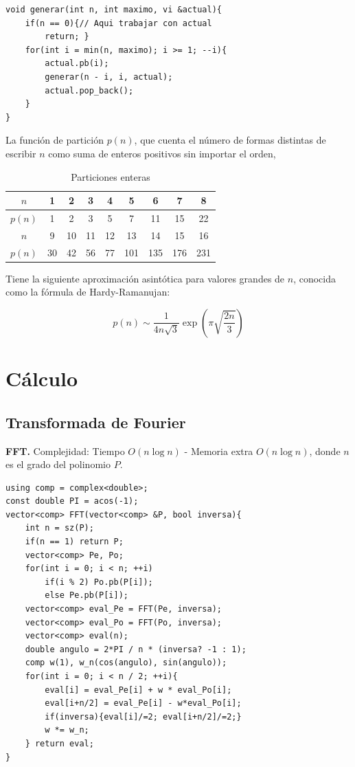 \documentclass[10pt,spanish,mexico]{article}
\numberwithin{equation}{section}
\begin{document}
\begin{multicols}{2}
\begin{verbatim}
void generar(int n, int maximo, vi &actual){
    if(n == 0){// Aqui trabajar con actual
        return; }
    for(int i = min(n, maximo); i >= 1; --i){
        actual.pb(i);
        generar(n - i, i, actual);
        actual.pop_back();
    }
}
\end{verbatim}
La función de partición \( p(n) \), que cuenta el número de formas distintas de escribir \( n \) como suma de enteros positivos sin importar el orden,

\begin{table}[H]
	\centering
	\begin{tabular}{|c|cccccccc|}
		\hline
		$n$ & 1 & 2 & 3 & 4 & 5 & 6 & 7 & 8\\
		\hline
		$p(n)$ & 1 & 2 & 3 & 5 & 7 & 11 & 15 & 22\\
		\hline
		\hline
		$n$ & 9 & 10 & 11 & 12 & 13 & 14 & 15 & 16 \\
		\hline
		 $p(n)$ & 30 & 42 & 56 & 77 & 101 & 135 & 176 & 231\\
		\hline
	\end{tabular}
	\caption{Particiones enteras}
\end{table}

Tiene la siguiente aproximación asintótica para valores grandes de $n$, conocida como la fórmula de Hardy-Ramanujan:

\[
p(n) \sim \frac{1}{4n\sqrt{3}} \exp\left( \pi \sqrt{\frac{2n}{3}} \right)
\]


\hrulefill
\section{Cálculo}
\subsection{Transformada de Fourier}
\textbf{FFT.} Complejidad: Tiempo $O(n\log n)$ - Memoria extra $O(n\log n)$, donde $n$ es el grado del polinomio $P$.
\begin{verbatim}
using comp = complex<double>;
const double PI = acos(-1);
vector<comp> FFT(vector<comp> &P, bool inversa){
    int n = sz(P);
    if(n == 1) return P;
    vector<comp> Pe, Po;
    for(int i = 0; i < n; ++i)
        if(i % 2) Po.pb(P[i]);
        else Pe.pb(P[i]);
    vector<comp> eval_Pe = FFT(Pe, inversa);
    vector<comp> eval_Po = FFT(Po, inversa);
    vector<comp> eval(n);
    double angulo = 2*PI / n * (inversa? -1 : 1);
    comp w(1), w_n(cos(angulo), sin(angulo));
    for(int i = 0; i < n / 2; ++i){
        eval[i] = eval_Pe[i] + w * eval_Po[i];
        eval[i+n/2] = eval_Pe[i] - w*eval_Po[i];
        if(inversa){eval[i]/=2; eval[i+n/2]/=2;}
        w *= w_n;
    } return eval;
}
\end{verbatim}


\end{multicols}
\end{document}
